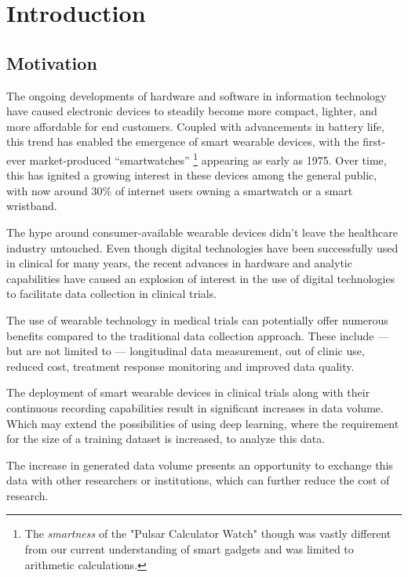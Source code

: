 \chapter{Introduction}\label{ch:introduction}

\section{Motivation}\label{sec:motivation}

The ongoing developments of hardware and software in information technology have caused electronic devices to steadily become more compact, lighter,
and more affordable for end customers.
Coupled with advancements in battery life, this trend has enabled the emergence of smart wearable devices,
with the first-ever market-produced ``smartwatches''
\footnote{The \textit{smartness} of the "Pulsar Calculator Watch" though was vastly different from our current
understanding of smart gadgets and was limited to arithmetic calculations.} appearing as early as 1975\cite{ometov_survey_2021}.
Over time, this has ignited a growing interest in these devices among the general public, with now around
30\%\cite{simon_kemp_rise_2023} of internet users owning a smartwatch or a smart wristband.

The hype around consumer-available wearable devices didn't leave the healthcare industry untouched.
Even though digital technologies have been successfully used in clinical for many years, the recent advances in
hardware and analytic capabilities have caused an explosion of interest in the use of digital technologies to
facilitate data collection in clinical trials\cite{clay_impact_2017}.

The use of wearable technology in medical trials can potentially offer numerous benefits compared to the
traditional data collection approach.
These include --- but are not limited to --- longitudinal data measurement, out of clinic use, reduced cost, treatment response monitoring and improved data quality. %

The deployment of smart wearable devices in clinical trials along with their continuous recording capabilities result in significant increases in data volume.
Which may extend the possibilities of using deep learning, where the requirement for the size of a training dataset is increased, to analyze this data.

The increase in generated data volume presents an opportunity to exchange this data with other researchers or institutions, which can further reduce the cost of research.

